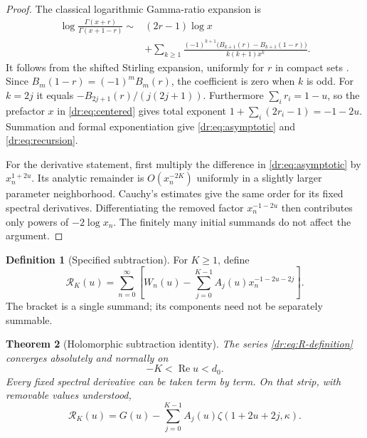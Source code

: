 \documentclass[11pt,letterpaper]{article}
\numberwithin{equation}{section}
\newtheorem{theorem}{Theorem}[section]
\theoremstyle{definition}
\newtheorem{definition}[theorem]{Definition}
\theoremstyle{remark}
\DeclareMathOperator{\Rea}{Re}
\newcommand{\Rcal}{\mathcal R}
\begin{document}
\begin{proof}
The classical logarithmic Gamma-ratio expansion is
\begin{align*}
 \log\frac{\Gamma(x+r)}{\Gamma(x+1-r)}
 \sim{}&(2r-1)\log x\\
 &+\sum_{k\geq1}\frac{(-1)^{k+1}
          \bigl(B_{k+1}(r)-B_{k+1}(1-r)\bigr)}{k(k+1)x^k}.
\end{align*}
It follows from the shifted Stirling expansion, uniformly for $r$ in
compact sets \cite{dlmf-gamma}. Since
$B_m(1-r)=(-1)^mB_m(r)$, the coefficient is zero when $k$ is odd. For
$k=2j$ it equals $-B_{2j+1}(r)/(j(2j+1))$.
Furthermore $\sum_i r_i=1-u$, so the prefactor $x$ in
\eqref{dr:eq:centered} gives total exponent
$1+\sum_i(2r_i-1)=-1-2u$. Summation and formal exponentiation give
\eqref{dr:eq:asymptotic} and \eqref{dr:eq:recursion}.

For the derivative statement, first multiply the difference in
\eqref{dr:eq:asymptotic} by $x_n^{1+2u}$. Its analytic remainder is
$O(x_n^{-2K})$ uniformly in a slightly larger parameter neighborhood.
Cauchy's estimates give the same order for its fixed spectral
derivatives. Differentiating the removed factor $x_n^{-1-2u}$ then
contributes only powers of $-2\log x_n$. The finitely many initial
summands do not affect the argument.
\end{proof}

\begin{definition}[Specified subtraction]
For $K\geq1$, define
\begin{equation}
 \Rcal_K(u)=\sum_{n=0}^{\infty}
 \left[W_n(u)-\sum_{j=0}^{K-1}
           A_j(u)x_n^{-1-2u-2j}\right].
 \label{dr:eq:R-definition}
\end{equation}
The bracket is a single summand; its components need not be separately
summable.
\end{definition}

\begin{theorem}[Holomorphic subtraction identity]
\label{dr:thm:subtraction}
The series \eqref{dr:eq:R-definition} converges absolutely and normally
on
\begin{equation}
 -K<\Rea u<d_0.
 \label{dr:eq:strip}
\end{equation}
Every fixed spectral derivative can be taken term by term. On that strip,
with removable values understood,
\begin{equation}
 \Rcal_K(u)=G(u)-\sum_{j=0}^{K-1}
                      A_j(u)\zeta(1+2u+2j,\kappa).
 \label{dr:eq:subtraction}
\end{equation}
\end{theorem}
\end{document}
